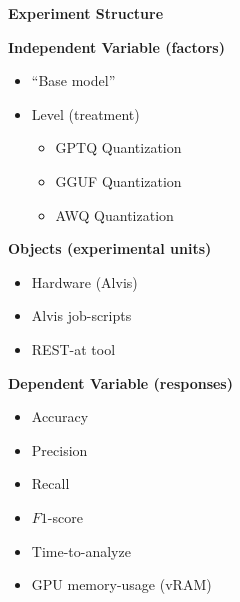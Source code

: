 \documentclass[conference]{IEEEtran}
\begin{document}
\begin{center}
   \begin{center}
        \textbf{Experiment Structure}
    \end{center}
    \begin{tcbraster}[raster columns=2, raster column skip=5pt, raster equal height=rows, raster row skip=5pt]
        \begin{roundedBox}
            \centering
            \textbf{Independent Variable (factors)}
            \begin{itemize}
                \item ``Base model''
                \item Level (treatment)
                    \begin{itemize}
                        \item GPTQ Quantization
                        \item GGUF Quantization
                        \item AWQ Quantization %
                    \end{itemize}
            \end{itemize}
        \end{roundedBox}
        \begin{roundedBox}
            \centering
            \textbf{Objects (experimental units)}
            \begin{itemize}
                \item Hardware (Alvis)
                \item Alvis job-scripts
                \item REST-at tool
            \end{itemize}
        \end{roundedBox}
        \begin{roundedBox}
            \centering
            \textbf{Dependent Variable (responses)}
            \begin{itemize}
                \item Accuracy
                \item Precision
                \item Recall
                \item $F1$-score
                \item Time-to-analyze
                \item GPU memory-usage (vRAM)

\end{itemize}
\end{roundedBox}
\end{tcbraster}
\end{center}
\end{document}
